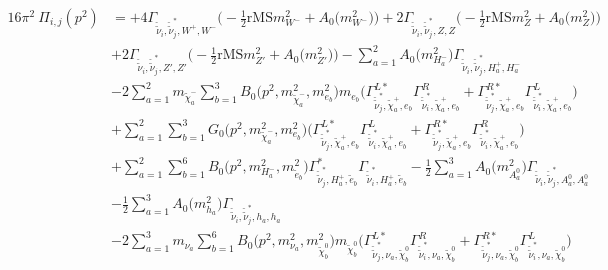 \begin{itemize}
\begin{align} 
16\pi^2 \ \Pi_{i,j}(p^2) &= +4 {\Gamma_{\check{\tilde{\nu}}_{{i}},\check{\tilde{\nu}}^*_{{j}},W^+,W^-}} \Big(-\frac{1}{2} \text{rMS} m^2_{W^-}  + {A_0\Big(m^2_{W^-}\Big)}\Big)+2 {\Gamma_{\check{\tilde{\nu}}_{{i}},\check{\tilde{\nu}}^*_{{j}},Z,Z}} \Big(-\frac{1}{2} \text{rMS} m^2_{Z}  + {A_0\Big(m^2_{Z}\Big)}\Big)\nonumber \\ 
 &+2 {\Gamma_{\check{\tilde{\nu}}_{{i}},\check{\tilde{\nu}}^*_{{j}},{Z'},{Z'}}} \Big(-\frac{1}{2} \text{rMS} m^2_{{Z'}}  + {A_0\Big(m^2_{{Z'}}\Big)}\Big)- \sum_{a=1}^{2}{A_0\Big(m^2_{H^-_{{a}}}\Big)} {\Gamma_{\check{\tilde{\nu}}_{{i}},\check{\tilde{\nu}}^*_{{j}},H^+_{{a}},H^-_{{a}}}}  \nonumber \\ 
 &-2 \sum_{a=1}^{2}m_{\tilde{\chi}^-_{{a}}} \sum_{b=1}^{3}{B_0\Big(p^{2},m^2_{\tilde{\chi}^-_{{a}}},m^2_{e_{{b}}}\Big)} m_{e_{{b}}} \Big({\Gamma^{L*}_{\check{\tilde{\nu}}^*_{{j}},\tilde{\chi}^+_{{a}},e_{{b}}}} {\Gamma^R_{\check{\tilde{\nu}}^*_{{i}},\tilde{\chi}^+_{{a}},e_{{b}}}}  + {\Gamma^{R*}_{\check{\tilde{\nu}}^*_{{j}},\tilde{\chi}^+_{{a}},e_{{b}}}} {\Gamma^L_{\check{\tilde{\nu}}^*_{{i}},\tilde{\chi}^+_{{a}},e_{{b}}}} \Big)  \nonumber \\ 
 &+\sum_{a=1}^{2}\sum_{b=1}^{3}{G_0\Big(p^{2},m^2_{\tilde{\chi}^-_{{a}}},m^2_{e_{{b}}}\Big)} \Big({\Gamma^{L*}_{\check{\tilde{\nu}}^*_{{j}},\tilde{\chi}^+_{{a}},e_{{b}}}} {\Gamma^L_{\check{\tilde{\nu}}^*_{{i}},\tilde{\chi}^+_{{a}},e_{{b}}}}  + {\Gamma^{R*}_{\check{\tilde{\nu}}^*_{{j}},\tilde{\chi}^+_{{a}},e_{{b}}}} {\Gamma^R_{\check{\tilde{\nu}}^*_{{i}},\tilde{\chi}^+_{{a}},e_{{b}}}} \Big)\nonumber \\ 
 &+\sum_{a=1}^{2}\sum_{b=1}^{6}{B_0\Big(p^{2},m^2_{H^-_{{a}}},m^2_{\tilde{e}_{{b}}}\Big)} {\Gamma^*_{\check{\tilde{\nu}}^*_{{j}},H^+_{{a}},\tilde{e}_{{b}}}} {\Gamma_{\check{\tilde{\nu}}^*_{{i}},H^+_{{a}},\tilde{e}_{{b}}}} -\frac{1}{2} \sum_{a=1}^{3}{A_0\Big(m^2_{A^0_{{a}}}\Big)} {\Gamma_{\check{\tilde{\nu}}_{{i}},\check{\tilde{\nu}}^*_{{j}},A^0_{{a}},A^0_{{a}}}}  \nonumber \\ 
 &-\frac{1}{2} \sum_{a=1}^{3}{A_0\Big(m^2_{h_{{a}}}\Big)} {\Gamma_{\check{\tilde{\nu}}_{{i}},\check{\tilde{\nu}}^*_{{j}},h_{{a}},h_{{a}}}}  \nonumber \\ 
 &-2 \sum_{a=1}^{3}m_{\nu_{{a}}} \sum_{b=1}^{6}{B_0\Big(p^{2},m^2_{\nu_{{a}}},m^2_{\tilde{\chi}^0_{{b}}}\Big)} m_{\tilde{\chi}^0_{{b}}} \Big({\Gamma^{L*}_{\check{\tilde{\nu}}^*_{{j}},\nu_{{a}},\tilde{\chi}^0_{{b}}}} {\Gamma^R_{\check{\tilde{\nu}}^*_{{i}},\nu_{{a}},\tilde{\chi}^0_{{b}}}}  + {\Gamma^{R*}_{\check{\tilde{\nu}}^*_{{j}},\nu_{{a}},\tilde{\chi}^0_{{b}}}} {\Gamma^L_{\check{\tilde{\nu}}^*_{{i}},\nu_{{a}},\tilde{\chi}^0_{{b}}}} \Big)  \nonumber \\ 

\end{align}
\end{itemize}
